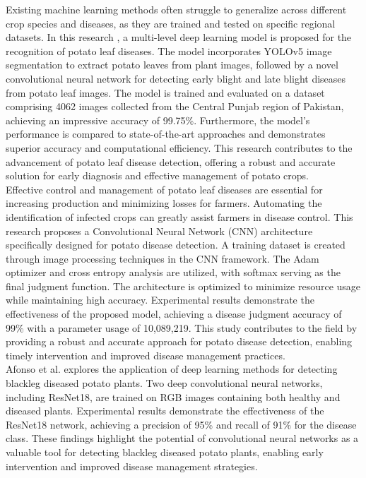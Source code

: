 \documentclass[conference]{IEEEtran}
\begin{document}
Existing machine learning methods often struggle to generalize across different crop species and diseases, as they are trained and tested on specific regional datasets. In this research \cite{electronics10172064}, a multi-level deep learning model is proposed for the recognition of potato leaf diseases. The model incorporates YOLOv5 image segmentation to extract potato leaves from plant images, followed by a novel convolutional neural network for detecting early blight and late blight diseases from potato leaf images. The model is trained and evaluated on a dataset comprising 4062 images collected from the Central Punjab region of Pakistan, achieving an impressive accuracy of 99.75\%. Furthermore, the model's performance is compared to state-of-the-art approaches and demonstrates superior accuracy and computational efficiency. \cite{electronics10172064} This research contributes to the advancement of potato leaf disease detection, offering a robust and accurate solution for early diagnosis and effective management of potato crops. \\

Effective control and management of potato leaf diseases are essential for increasing production and minimizing losses for farmers. Automating the identification of infected crops can greatly assist farmers in disease control. \cite{9181312} This research proposes a Convolutional Neural Network (CNN) architecture specifically designed for potato disease detection. A training dataset is created through image processing techniques in the CNN framework. The Adam optimizer and cross entropy analysis are utilized, with softmax serving as the final judgment function. The architecture is optimized to minimize resource usage while maintaining high accuracy. Experimental results demonstrate the effectiveness of the proposed model, achieving a disease judgment accuracy of 99\% with a parameter usage of 10,089,219. This study contributes to the field by providing a robust and accurate approach for potato disease detection, enabling timely intervention and improved disease management practices.\\

Afonso et al. \cite{AFONSO20196} explores the application of deep learning methods for detecting blackleg diseased potato plants. Two deep convolutional neural networks, including ResNet18, are trained on RGB images containing both healthy and diseased plants. Experimental results demonstrate the effectiveness of the ResNet18 network, achieving a precision of 95\% and recall of 91\% for the disease class. These findings highlight the potential of convolutional neural networks as a valuable tool for detecting blackleg diseased potato plants, enabling early intervention and improved disease management strategies.\\
\end{document}
